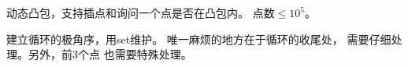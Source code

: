 \begin{prob}
	动态凸包，支持插点和询问一个点是否在凸包内。
	点数$\le 10^5$。
\end{prob}

\begin{sol}
	建立循环的极角序，用set维护。
	唯一麻烦的地方在于循环的收尾处，
	需要仔细处理。另外，前3个点
	也需要特殊处理。
\end{sol}
